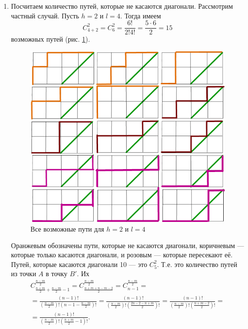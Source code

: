 \documentclass{book}
\begin{document}
\begin{enumerate}[label=(\roman*)]
\item Посчитаем количество путей, которые не касаются диагонали.
Рассмотрим частный случай.
Пусть $h = 2$ и $l = 4$.
Тогда имеем
$$C_{4+2}^2 =
C_6^2 =
\frac{6!}{2! 4!} =
\frac{5 \cdot 6}{2} =
15$$
возможных путей (рис. \ref{fig:42210}).

\begin{figure}[h!]
  \centering
  \includegraphics[width=.8\textwidth]{./pictures/4_22_10.png}
  \caption{Все возможные пути для $h = 2$ и $l = 4$}
  \label{fig:42210}
\end{figure}

Оранжевым обозначены пути, которые не касаются диагонали, коричневым --- которые только касаются диагонали, и розовым --- которые пересекают её.
Путей, которые касаются диагонали 10 --- это $C_5^2$.
Т.е. это количество путей из точки $A$ в точку $B'$.
Их
\begin{equation*}
\begin{split}
C_{ \frac{n+m}{2} + \frac{n-m}{2} - 1}^{ \frac{n-m}{2} } =
C_{ \frac{n+m+n-m-2}{2} }^{ \frac{n-m}{2} } =
C_{n-1}^{ \frac{n-m}{2} } = \\
= \frac{ \left( n-1 \right)!}{ \left( \frac{n-m}{2} \right)! \left( n - 1 - \frac{n-m}{2} \right)!} =
\frac{ \left( n-1 \right)!}{ \left( \frac{n-m}{2} \right)! \left( \frac{2n-2-n+m}{2} \right)!} =
\frac{ \left( n-1 \right)!}{ \left( \frac{n-m}{2} \right)! \left( \frac{n+m-2}{2} \right)!} = \\
= \frac{ \left( n-1 \right)!}{ \left( \frac{n-m}{2} \right)! \left( \frac{n+m}{2} - 1 \right)!}.
\end{split}
\end{equation*}


\end{enumerate}
\end{document}
